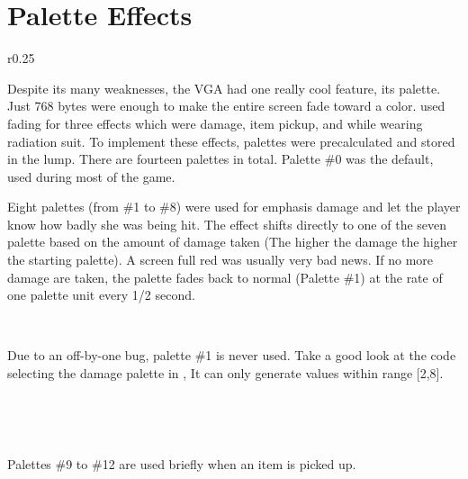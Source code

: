 \section{Palette Effects}
\label{label_palettes} \label{doom_palette}
\begin{wrapfigure}[8]{r}{0.25\textwidth}
\centering
{}
\end{wrapfigure}

Despite its many weaknesses, the VGA had one really cool feature, its palette. Just 768 bytes were enough to make the entire screen fade toward a color. \doom{}used fading for three effects which were damage, item pickup, and while wearing radiation suit. To implement these effects, palettes were precalculated and stored in the  lump. There are fourteen palettes in total. Palette \#0 was the default, used during most of the game.\\
\par
Eight palettes (from \#1 to \#8) were used for emphasis damage and let the player know how badly she was being hit. The effect shifts directly to one of the seven palette based on the amount of damage taken (The higher the damage the higher the starting palette). A screen full red was usually very bad news. If no more damage are taken, the palette fades back to normal (Palette \#1) at the rate of one palette unit every 1/2 second.\\
\par
{}
\\
\par
Due to an off-by-one bug, palette \#1 is never used. Take a good look at the code selecting the damage palette in , It can only generate values within range [2,8].\\
\par
{}\\
\par
{}\\
\par
Palettes \#9 to \#12 are used briefly when an item is picked up.\\
\par
{}
